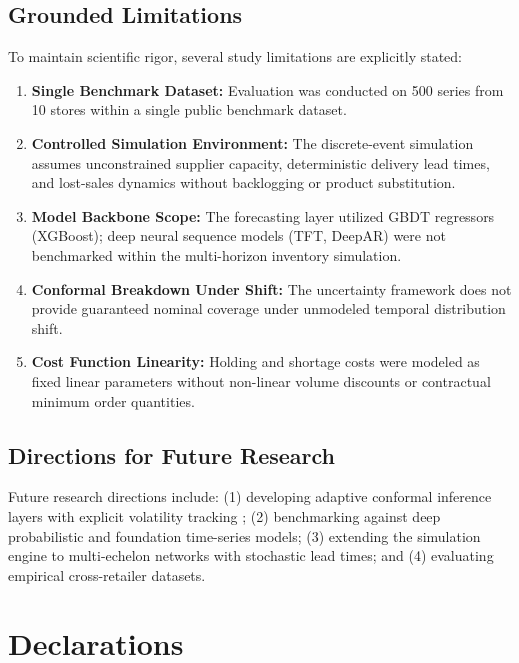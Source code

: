 \documentclass[11pt,a4paper]{article}
\begin{document}
\subsection{Grounded Limitations}
\label{sec:concl_limitations}
To maintain scientific rigor, several study limitations are explicitly stated:
\begin{enumerate}
    \item \textbf{Single Benchmark Dataset:} Evaluation was conducted on 500 series from 10 stores within a single public benchmark dataset.
    \item \textbf{Controlled Simulation Environment:} The discrete-event simulation assumes unconstrained supplier capacity, deterministic delivery lead times, and lost-sales dynamics without backlogging or product substitution.
    \item \textbf{Model Backbone Scope:} The forecasting layer utilized GBDT regressors (XGBoost); deep neural sequence models (TFT, DeepAR) were not benchmarked within the multi-horizon inventory simulation.
    \item \textbf{Conformal Breakdown Under Shift:} The uncertainty framework does not provide guaranteed nominal coverage under unmodeled temporal distribution shift.
    \item \textbf{Cost Function Linearity:} Holding and shortage costs were modeled as fixed linear parameters without non-linear volume discounts or contractual minimum order quantities.
\end{enumerate}

\subsection{Directions for Future Research}
\label{sec:concl_future}
Future research directions include: (1) developing adaptive conformal inference layers with explicit volatility tracking \cite{gibbs2021adaptive}; (2) benchmarking against deep probabilistic and foundation time-series models; (3) extending the simulation engine to multi-echelon networks with stochastic lead times; and (4) evaluating empirical cross-retailer datasets.

\section*{Declarations}
\end{document}
